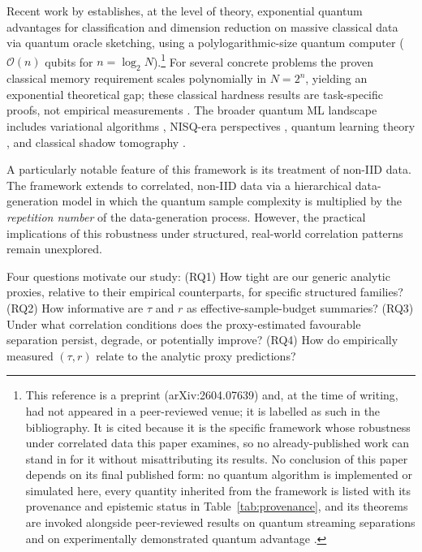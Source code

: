 \documentclass[sensors,article,submit,pdftex,moreauthors]{Definitions/mdpi}
\newcommand{\bigO}{\mathcal{O}}
\providecommand{\DIFadd}[1]{{\protect\color{blue}#1}} %
\providecommand{\DIFdel}[1]{} %
\providecommand{\DIFaddbegin}{} %
\providecommand{\DIFaddend}{} %
\providecommand{\DIFdelbegin}{} %
\providecommand{\DIFdelend}{} %
\begin{document}
Recent work by \citet{zhao2026exponential} \DIFdelbegin \DIFdel{shows that quantum oracle sketching achieves }\DIFdelend \DIFaddbegin \DIFadd{establishes, at the level of theory, }\DIFaddend exponential quantum advantages for classification and dimension reduction on massive classical data \DIFaddbegin \DIFadd{via quantum oracle sketching}\DIFaddend , using a polylogarithmic-size quantum computer ($\bigO(n)$ qubits for $n = \log_2 N$).\DIFaddbegin \footnote{\DIFadd{This reference is a preprint (arXiv:2604.07639) and, at the time of writing, had not appeared in a peer-reviewed venue; it is labelled as such in the bibliography. It is cited because it is the specific framework whose robustness under correlated data this paper examines, so no already-published work can stand in for it without misattributing its results. No conclusion of this paper depends on its final published form: no quantum algorithm is implemented or simulated here, every quantity inherited from the framework is listed with its provenance and epistemic status in Table~\ref{tab:provenance}, and its theorems are invoked alongside peer-reviewed results on quantum streaming separations }\citep{kallaugher2021streaming, kallaugher2025designquantum} \DIFadd{and on experimentally demonstrated quantum advantage }\citep{huang2022experiments}\DIFadd{.}} \DIFaddend For several concrete problems the \DIFaddbegin \DIFadd{proven }\DIFaddend classical memory requirement scales polynomially in $N = 2^n$, yielding an exponential \DIFdelbegin \DIFdel{gap; the }\DIFdelend \DIFaddbegin \DIFadd{theoretical gap; these }\DIFaddend classical hardness results are task-specific \DIFaddbegin \DIFadd{proofs, not empirical measurements }\DIFaddend \citep{harrow2009hhl, havlicek2019qkernels, schuld2021encoding, biamonte2017qml}. The broader quantum ML landscape includes variational algorithms \citep{cerezo2021variational}, NISQ-era perspectives \citep{preskill2018nisq}, quantum learning theory \citep{schuld2018supervised}, and classical shadow tomography \citep{huang2020shadows}.

A particularly notable feature of this framework is its treatment of non\nobreakdash-IID data. The framework extends to correlated, non\nobreakdash-IID data via a hierarchical data-generation model in which the quantum sample complexity is multiplied by the \emph{repetition number} of the data-generation process. However, the practical implications of this robustness under structured, real-world correlation patterns remain unexplored.

Four questions motivate our study: (RQ1) How tight are \DIFdelbegin \DIFdel{the generic robustness guarantees }\DIFdelend \DIFaddbegin \DIFadd{our generic analytic proxies, relative to their empirical counterparts, }\DIFaddend for specific structured families? (RQ2) How informative are $\tau$ and $r$ as \DIFdelbegin \DIFdel{accuracy predictors}\DIFdelend \DIFaddbegin \DIFadd{effective-sample-budget summaries}\DIFaddend ? (RQ3) Under what correlation conditions does the proxy-estimated favourable separation persist, degrade, or potentially improve? (RQ4) How do empirically measured $(\tau, r)$ relate to the analytic proxy predictions?
\end{document}
